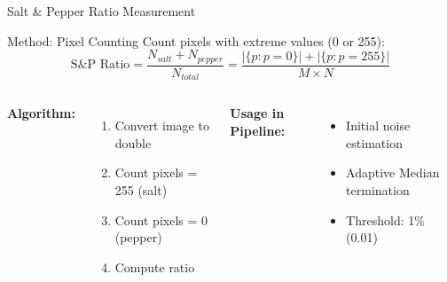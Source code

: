 \documentclass[aspectratio=169]{beamer}
\begin{document}
\begin{frame}{Salt \& Pepper Ratio Measurement}
    \begin{block}{Method: Pixel Counting}
        Count pixels with extreme values (0 or 255):
        \begin{equation}
            \text{S\&P Ratio} = \frac{N_{salt} + N_{pepper}}{N_{total}} = \frac{|\{p : p = 0\}| + |\{p : p = 255\}|}{M \times N}
        \end{equation}
    \end{block}
    
    \begin{columns}
        \textbf{Algorithm:}
        \begin{enumerate}
            \item Convert image to double
            \item Count pixels = 255 (salt)
            \item Count pixels = 0 (pepper)
            \item Compute ratio
        \end{enumerate}
        
        \textbf{Usage in Pipeline:}
        \begin{itemize}
            \item Initial noise estimation
            \item Adaptive Median termination
            \item Threshold: 1\% (0.01)
        \end{itemize}
    \end{columns}
\end{frame}
\end{document}
